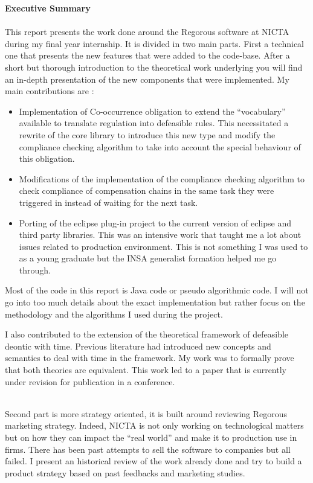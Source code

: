 \documentclass[10pt]{report}
\begin{document}
\restoregeometry
\renewcommand{\thesection}{\Roman{section}} 
\renewcommand{\abstractname}{Executive Summary}
\begin{center}
\begin{minipage}{\textwidth}
\textbf{\large Executive Summary}\\\\ This report presents the work done around the Regorous software at NICTA during my final year internship. It is divided in two main parts. First a technical one that presents the new features that were added to the code-base. After a short but thorough introduction to the theoretical work underlying you will find an in-depth presentation of the new components that were implemented. My main contributions are : 
\begin{itemize}
\item Implementation of Co-occurrence obligation to extend the \enquote{vocabulary} available to translate regulation into defeasible rules. This necessitated a rewrite of the core library to introduce this new type and modify the compliance checking algorithm to take into account the special behaviour of this obligation.
\item Modifications of the implementation of the compliance checking algorithm to check compliance of compensation chains in the same task they were triggered in instead of waiting for the next task. 
\item Porting of the eclipse plug-in project to the current version of eclipse and third party libraries. This was an intensive work that taught me a lot about issues related to production environment. This is not something I was used to as a young graduate but the INSA generalist formation helped me go through.
\end{itemize}

Most of the code in this report is Java code or pseudo algorithmic code. I will not go into too much details about the exact implementation but rather focus on the methodology and the algorithms I used during the project.

I also contributed to the extension of the theoretical framework of defeasible deontic with time. Previous literature had introduced new concepts and semantics to deal with time in the framework. My work was to formally prove that both theories are equivalent. This work led to a paper that is currently under revision for publication in a conference.

~\\Second part is more strategy oriented, it is built around reviewing Regorous marketing strategy. Indeed, NICTA is not only working on technological matters but on how they can impact the \enquote{real world} and make it to production use in firms. There has been past attempts to sell the software to companies but all failed. I present an historical review of the work already done and try to build a product strategy based on past feedbacks and marketing studies.


\end{minipage}
\end{center}
\end{document}
